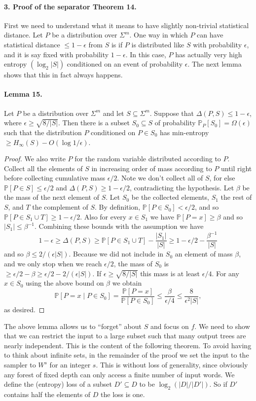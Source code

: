 \documentclass[10pt,a4paper]{article}
\begin{document}
\paragraph{3. Proof of the separator Theorem 14.}
First we need to understand what it means to have slightly non-trivial statistical distance. Let $P$ be a distribution over $\Sigma^m$. One way in which $P$ can have statistical distance $\leq1-\epsilon$ from $S$ is if $P$ is distributed like $S$ with probability $\epsilon$, and it is say fixed with probability $1-\epsilon$. In this case, $P$ has actually very high entropy $(\log_2|S|)$ conditioned on an event of probability $\epsilon$. The next lemma shows that this in fact always happens.
\paragraph{Lemma 15.}
Let $P$ be a distribution over $\Sigma^m$ and let $S\subseteq\Sigma^m$. Suppose that $\Delta(P,S)\leq1-\epsilon$, where $\epsilon\geq\sqrt{8/|S|}$. Then there is a subset $S_0\subseteq S$ of probability $\mathbb P_P[S_0]=\Omega(\epsilon)$ such that the distribution $P$ conditioned on $P\in S_0$ has min-entropy $\geq H_\infty(S)-O(\log1/\epsilon)$.
\begin{proof}
We also write $P$ for the random variable distributed according to $P$. Collect all the elements of $S$ in increasing order of mass according to $P$ until right before collecting cumulative mass $\epsilon/2$. Note we don't collect all of $S$, for else $\mathbb P[P\in S]\leq\epsilon/2$ and $\Delta(P,S)\geq1-\epsilon/2$, contradicting the hypothesis.
Let $\beta$ be the mass of the next element of $S$. Let $S_0$ be the collected elements, $S_1$ the rest of $S$, and $T$ the complement of $S$. By definition, $\mathbb P[P\in S_0]<\epsilon/2$, and so $\mathbb P[P\in S_1\cup T]\geq1-\epsilon/2$. Also for every $x\in S_1$ we have $\mathbb P[P=x]\geq\beta$ and so $|S_1|\leq\beta^{-1}$. Combining these bounds with the assumption we have
\[1-\epsilon\geq\Delta(P,S)\geq\mathbb P[P\in S_1\cup T]-\frac{|S_1|}{|S|}\geq1-\epsilon/2-\frac{\beta^{-1}}{|S|}\]
and so $\beta\leq2/(\epsilon|S|)$.
Because we did not include in $S_0$ an element of mass $\beta$, and we only stop when we reach $\epsilon/2$, the mass of $S_0$ is $\geq\epsilon/2-\beta\geq\epsilon/2-2/(\epsilon|S|)$. If $\epsilon\geq\sqrt{8/|S|}$ this mass is at least $\epsilon/4$.
For any $x\in S_0$ using the above bound on $\beta$ we obtain
\[\mathbb P[P=x\mid P\in S_0]=\frac{\mathbb P[P=x]}{\mathbb P[P\in S_0]}\leq\frac{\beta}{\epsilon/4}\leq\frac8{\epsilon^2|S|},\]
as desired.
\end{proof}
The above lemma allows us to ``forget'' about $S$ and focus on $f$. We need to show that we can restrict the input to a large subset such that many output trees are nearly independent. This is the content of the following theorem. To avoid having to think about infinite sets, in the remainder of the proof we set the input to the sampler to $W^s$ for an integer $s$. This is without loss of generality, since obviously any forest of fixed depth can only access a finite number of input words.
We define the (entropy) loss of a subset $D'\subseteq D$ to be $\log_2(|D|/|D'|)$. So if $D'$ contains half the elements of $D$ the loss is one.
\end{document}
